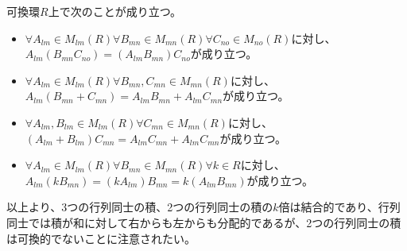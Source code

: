 \documentclass[dvipdfmx]{jsarticle}
\begin{document}
\begin{thm}\label{2.1.3.3}
可換環$R$上で次のことが成り立つ。
\begin{itemize}
\item
  $\forall A_{lm} \in M_{lm}(R)\forall B_{mn} \in M_{mn}(R)\forall C_{no} \in M_{no}(R)$に対し、$A_{lm}\left( B_{mn}C_{no} \right) = \left( A_{lm}B_{mn} \right)C_{no}$が成り立つ。
\item
  $\forall A_{lm} \in M_{lm}(R)\forall B_{mn},C_{mn} \in M_{mn}(R)$に対し、$A_{lm}\left( B_{mn} + C_{mn} \right) = A_{lm}B_{mn} + A_{lm}C_{mn}$が成り立つ。
\item
  $\forall A_{lm},B_{lm} \in M_{lm}(R)\forall C_{mn} \in M_{mn}(R)$に対し、$\left( A_{lm} + B_{lm} \right)C_{mn} = A_{lm}C_{mn} + A_{lm}C_{mn}$が成り立つ。
\item
  $\forall A_{lm} \in M_{lm}(R)\forall B_{mn} \in M_{mn}(R)\forall k \in R$に対し、$A_{lm}\left( kB_{mn} \right) = \left( kA_{lm} \right)B_{mn} = k\left( A_{lm}B_{mn} \right)$が成り立つ。
\end{itemize}\par
以上より、3つの行列同士の積、2つの行列同士の積の$k$倍は結合的であり、行列同士では積が和に対して右からも左からも分配的であるが、2つの行列同士の積は可換的でないことに注意されたい。
\end{thm}
\end{document}
